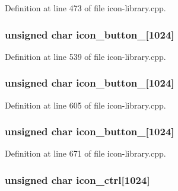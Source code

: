 Definition at line 473 of file icon-\/library.cpp.

\hypertarget{icon-library_8cpp_a8b623a158b81e8b5593b133a7f411e2c}{
\subsubsection[{icon\_\-button\_\-6}]{\setlength{\rightskip}{0pt plus 5cm}unsigned char {\bf icon\_\-button\_}\mbox{[}1024\mbox{]}}}
\label{icon-library_8cpp_a8b623a158b81e8b5593b133a7f411e2c}


Definition at line 539 of file icon-\/library.cpp.

\hypertarget{icon-library_8cpp_a34693e9ff9d5ccb2a376f6050eb77b9d}{
\subsubsection[{icon\_\-button\_\-7}]{\setlength{\rightskip}{0pt plus 5cm}unsigned char {\bf icon\_\-button\_}\mbox{[}1024\mbox{]}}}
\label{icon-library_8cpp_a34693e9ff9d5ccb2a376f6050eb77b9d}


Definition at line 605 of file icon-\/library.cpp.

\hypertarget{icon-library_8cpp_a7716f73ec2c4737ae5da897c03e84065}{
\subsubsection[{icon\_\-button\_\-8}]{\setlength{\rightskip}{0pt plus 5cm}unsigned char {\bf icon\_\-button\_}\mbox{[}1024\mbox{]}}}
\label{icon-library_8cpp_a7716f73ec2c4737ae5da897c03e84065}


Definition at line 671 of file icon-\/library.cpp.

\hypertarget{icon-library_8cpp_aee463345ed72127a3be10acc0d71d40a}{
\subsubsection[{icon\_\-ctrl}]{\setlength{\rightskip}{0pt plus 5cm}unsigned char {\bf icon\_\-ctrl}\mbox{[}1024\mbox{]}}}
\label{icon-library_8cpp_aee463345ed72127a3be10acc0d71d40a}


